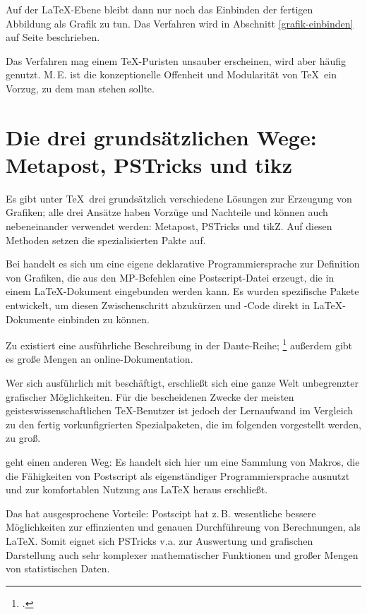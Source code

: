 Auf der \LaTeX -Ebene bleibt dann nur noch das Einbinden der fertigen Abbildung als Grafik zu
tun. Das Verfahren wird in Abschnitt \ref{grafik-einbinden} auf Seite \pageref{grafik-einbinden}
beschrieben.

Das Verfahren mag einem \TeX -Puristen unsauber erscheinen, wird aber häufig genutzt.
M.\,E. ist die konzeptionelle Offenheit und Modularität von \TeX\ ein Vorzug, zu dem man stehen sollte.


\section{Die drei grundsätzlichen Wege: Metapost, PSTricks und tikz}

Es gibt unter \TeX\ drei grundsätzlich verschiedene Lösungen zur Erzeugung von Grafiken;
alle drei Ansätze haben Vorzüge und Nachteile und können auch nebeneinander verwendet werden:
Metapost, PSTricks und tikZ. Auf diesen Methoden setzen die spezialisierten Pakte auf.

Bei  handelt es sich um eine eigene deklarative Programmiersprache zur Definition
von Grafiken, die aus den MP-Befehlen eine Postscript-Datei erzeugt, die in einem \LaTeX -Dokument
eingebunden werden kann.
Es wurden spezifische Pakete entwickelt, um diesen Zwischenschritt abzukürzen und 
-Code direkt in \LaTeX -Dokumente einbinden zu können.

Zu  existiert eine ausführliche Beschreibung in der Dante-Reihe;%
\footcite{entenmann:metapost}
außerdem gibt es große Mengen an online-Dokumentation.

Wer sich ausführlich mit  beschäftigt, erschließt sich eine ganze Welt unbegrenzter
grafischer Möglichkeiten. Für die bescheidenen Zwecke der meisten geisteswissenschaftlichen
\TeX -Benutzer ist jedoch der Lernaufwand im Vergleich zu den fertig vorkunfigrierten Spezialpaketen,
die im folgenden vorgestellt werden, zu groß.



 geht einen anderen Weg: Es handelt sich hier um eine Sammlung von Makros, die die
Fähigkeiten von Postscript als eigenständiger Programmiersprache ausnutzt und zur komfortablen
Nutzung aus \LaTeX{} heraus erschließt.

Das hat ausgesprochene Vorteile: Postscipt hat z.\,B. wesentliche bessere Möglichkeiten zur
effinzienten und genauen Durchführeung von Berechnungen, als \LaTeX{}.
Somit eignet sich PSTricks v.a. zur Auswertung und grafischen Darstellung auch sehr komplexer
mathematischer Funktionen und großer Mengen von statistischen Daten. 


